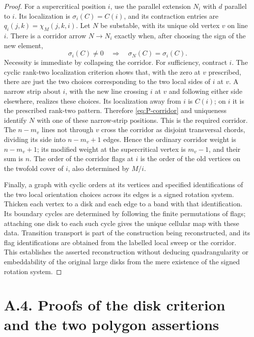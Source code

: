\begin{proof}
For a supercritical position $i$, use the parallel extension
$N_i$ with $d$ parallel to $i$.  Its localization is
$\sigma_i(C)=C(i)$, and its contraction entries are
$q_i(j,k)=\chi_M(j,k,i)$.  Let $N$ be substable, with its unique old
vertex $v$ on line $i$.  There is a corridor arrow $N\to N_i$ exactly
when, after choosing the sign of the new element,
\[
          \sigma_i(C)\ne0 \quad\Longrightarrow\quad
          \sigma_N(C)=\sigma_i(C) .                     \label{eq:P-corridor}
\]
Necessity is immediate by collapsing the corridor.  For sufficiency,
contract $i$.  The cyclic rank-two localization criterion shows that,
with the zero at $v$ prescribed, there are just the two choices
corresponding to the two local sides of $i$ at $v$.  A narrow strip
about $i$, with the new line crossing $i$ at $v$ and following either
side elsewhere, realizes these choices.  Its localization away from
$i$ is $C(i)$; on $i$ it is the prescribed rank-two pattern.
Therefore \eqref{eq:P-corridor} and uniqueness identify $N$ with one
of these narrow-strip positions.  This is the required corridor.
The $n-m_v$ lines not through $v$ cross the corridor as disjoint
transversal chords, dividing its side into $n-m_v+1$ edges.  Hence
the ordinary corridor weight is $n-m_v+1$; its modified weight at
the supercritical vertex is $m_v-1$, and their sum is $n$.
The order of the corridor flags at $i$ is the order of the old
vertices on the twofold cover of $i$, also determined by $M/i$.

Finally, a graph with cyclic orders at its vertices and specified
identifications of the two local orientation choices across its edges
is a signed rotation system.  Thicken each vertex to a disk and each
edge to a band with that identification.  Its boundary cycles are
determined by following the finite permutations of flags; attaching
one disk to each such cycle gives the unique cellular map with these
data.  Transition transport is part of the construction being
reconstructed, and its flag identifications are obtained from the
labelled local sweep or the corridor.  This establishes the asserted
reconstruction without deducing quadrangularity or embeddability of
the original large disks from the mere existence of the signed
rotation system.
\end{proof}

\section{A.4. Proofs of the disk criterion and the two polygon assertions}
\label{sec:A4}

